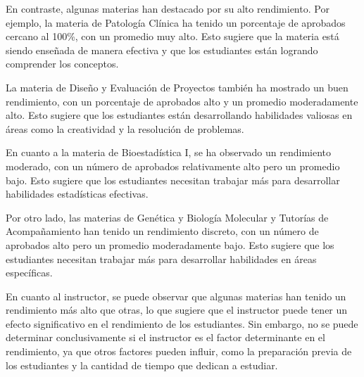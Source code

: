 En contraste, algunas materias han destacado por su alto rendimiento. Por ejemplo, la materia de Patología Clínica ha tenido un porcentaje de aprobados cercano al 100\%, con un promedio muy alto. Esto sugiere que la materia está siendo enseñada de manera efectiva y que los estudiantes están logrando comprender los conceptos.

La materia de Diseño y Evaluación de Proyectos también ha mostrado un buen rendimiento, con un porcentaje de aprobados alto y un promedio moderadamente alto. Esto sugiere que los estudiantes están desarrollando habilidades valiosas en áreas como la creatividad y la resolución de problemas.

En cuanto a la materia de Bioestadística I, se ha observado un rendimiento moderado, con un número de aprobados relativamente alto pero un promedio bajo. Esto sugiere que los estudiantes necesitan trabajar más para desarrollar habilidades estadísticas efectivas.

Por otro lado, las materias de Genética y Biología Molecular y Tutorías de Acompañamiento han tenido un rendimiento discreto, con un número de aprobados alto pero un promedio moderadamente bajo. Esto sugiere que los estudiantes necesitan trabajar más para desarrollar habilidades en áreas específicas.

En cuanto al instructor, se puede observar que algunas materias han tenido un rendimiento más alto que otras, lo que sugiere que el instructor puede tener un efecto significativo en el rendimiento de los estudiantes. Sin embargo, no se puede determinar conclusivamente si el instructor es el factor determinante en el rendimiento, ya que otros factores pueden influir, como la preparación previa de los estudiantes y la cantidad de tiempo que dedican a estudiar.

